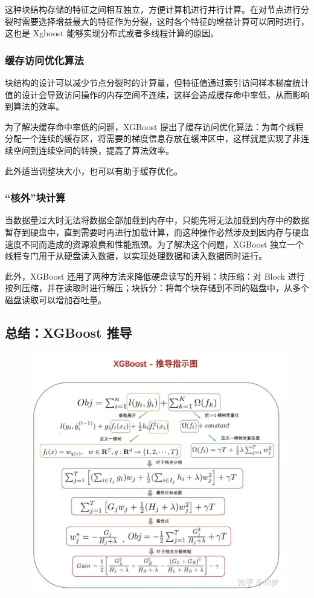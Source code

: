 \documentclass[12pt]{article}
\begin{document}
这种块结构存储的特征之间相互独立，方便计算机进行并行计算。在对节点进行分裂时需要选择增益最大的特征作为分裂，这时各个特征的增益计算可以同时进行，这也是 Xgboost 能够实现分布式或者多线程计算的原因。

\subsubsection{缓存访问优化算法}
块结构的设计可以减少节点分裂时的计算量，但特征值通过索引访问样本梯度统计值的设计会导致访问操作的内存空间不连续，这样会造成缓存命中率低，从而影响到算法的效率。

为了解决缓存命中率低的问题，XGBoost 提出了缓存访问优化算法：为每个线程分配一个连续的缓存区，将需要的梯度信息存放在缓冲区中，这样就是实现了非连续空间到连续空间的转换，提高了算法效率。

此外适当调整块大小，也可以有助于缓存优化。

\subsubsection{“核外”块计算}
当数据量过大时无法将数据全部加载到内存中，只能先将无法加载到内存中的数据暂存到硬盘中，直到需要时再进行加载计算，而这种操作必然涉及到因内存与硬盘速度不同而造成的资源浪费和性能瓶颈。为了解决这个问题，XGBoost 独立一个线程专门用于从硬盘读入数据，以实现处理数据和读入数据同时进行。

此外，XGBoost 还用了两种方法来降低硬盘读写的开销：块压缩：对 Block 进行按列压缩，并在读取时进行解压；块拆分：将每个块存储到不同的磁盘中，从多个磁盘读取可以增加吞吐量。

\subsection{总结：XGBoost 推导}
\begin{figure}[H]
    \centering
    \includegraphics[width=1\textwidth]{fig/XGBoost_Eq_Conclusion.jpg}
\end{figure}
\end{document}
